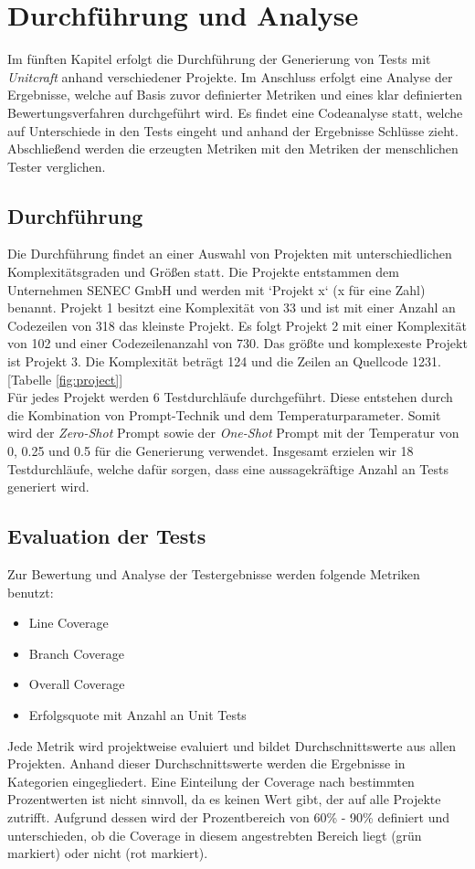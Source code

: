 \chapter{Durchführung und Analyse}
Im fünften Kapitel erfolgt die Durchführung der Generierung von Tests mit \textit{Unitcraft} anhand verschiedener Projekte. Im Anschluss erfolgt eine Analyse der Ergebnisse, welche auf Basis zuvor definierter Metriken und eines klar definierten Bewertungsverfahren durchgeführt wird. Es findet eine Codeanalyse statt, welche auf Unterschiede in den Tests eingeht und anhand der Ergebnisse Schlüsse zieht. Abschließend werden die erzeugten Metriken mit den Metriken der menschlichen Tester verglichen.

\section{Durchführung}
Die Durchführung findet an einer Auswahl von Projekten mit unterschiedlichen Komplexitätsgraden und Größen statt. Die Projekte entstammen dem Unternehmen SENEC GmbH und werden mit `Projekt x` (x für eine Zahl) benannt. Projekt 1 besitzt eine Komplexität von 33 und ist mit einer Anzahl an Codezeilen von 318 das kleinste Projekt. Es folgt Projekt 2 mit einer Komplexität von 102 und einer Codezeilenanzahl von 730. Das größte und komplexeste Projekt ist Projekt 3. Die Komplexität beträgt 124 und die Zeilen an Quellcode 1231. [Tabelle \ref{fig:project}]\\Für jedes Projekt werden 6 Testdurchläufe durchgeführt. Diese entstehen durch die Kombination von Prompt-Technik und dem Temperaturparameter. Somit wird der \textit{Zero-Shot} Prompt sowie der \textit{One-Shot} Prompt mit der Temperatur von 0, 0.25 und 0.5 für die Generierung verwendet. Insgesamt erzielen wir 18 Testdurchläufe, welche dafür sorgen, dass eine aussagekräftige Anzahl an Tests generiert wird.

\section{Evaluation der Tests}
Zur Bewertung und Analyse der Testergebnisse werden folgende Metriken benutzt: 
\begin{itemize}
    \setlength{\parskip}{1pt}
    \item Line Coverage
    \item Branch Coverage
    \item Overall Coverage
    \item Erfolgsquote mit Anzahl an Unit Tests
\end{itemize}
Jede Metrik wird projektweise evaluiert und bildet Durchschnittswerte aus allen Projekten. Anhand dieser Durchschnittswerte werden die Ergebnisse in Kategorien eingegliedert. Eine Einteilung der Coverage nach bestimmten Prozentwerten ist nicht sinnvoll, da es keinen Wert gibt, der auf alle Projekte zutrifft. Aufgrund dessen wird der Prozentbereich von 60\% - 90\% definiert und unterschieden, ob die Coverage in diesem angestrebten Bereich liegt (grün markiert) oder nicht (rot markiert). \cite{WhatReasonableCode}

